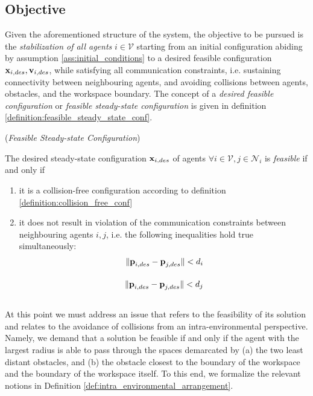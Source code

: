\subsection{Objective}

Given the aforementioned structure of the system, the objective to be
pursued is the \textit{stabilization of all agents} $i \in \mathcal{V}$ starting
from an initial configuration abiding by assumption
\eqref{ass:initial_conditions} to a desired feasible configuration
$\bm{\mathbf{x}}_{i,des}, \bm{\mathbf{v}}_{i,des}$, while
satisfying all communication constraints, i.e. sustaining connectivity between
neighbouring agents, and avoiding collisions between agents, obstacles, and the
workspace boundary. The concept of a \textit{desired feasible configuration}
or \textit{feasible steady-state configuration} is given in definition
\eqref{definition:feasible_steady_state_conf}.

\begin{bw_box}
\begin{definition} (\textit{Feasible Steady-state Configuration})
\label{definition:feasible_steady_state_conf}

The desired steady-state configuration $\bm{\mathbf{x}}_{i,des}$ of agents
$\forall i \in \mathcal{V}, j \in \mathcal{N}_i$ is \textit{feasible} if and
only if
\begin{enumerate}
  \item it is a collision-free configuration according to definition
    \eqref{definition:collision_free_conf}
  \item it does not result in violation of the communication constraints
    between neighbouring agents $i,j$, i.e. the following inequalities hold
    true simultaneously:
    \begin{align}
      \|\bm{\mathbf{p}}_{i,des} - \bm{\mathbf{p}}_{j,des}\| < d_i \\[2.5ex]
      \|\bm{\mathbf{p}}_{i,des} - \bm{\mathbf{p}}_{j,des}\| < d_j \\[2.5ex]
    \end{align}
\end{enumerate}

\end{definition}
\end{bw_box}

At this point we must address an issue
that refers to the feasibility of its solution and relates to the avoidance of
collisions from an intra-environmental perspective. Namely, we demand that a
solution be feasible if and only if the agent with the largest radius is able to
pass through the spaces demarcated by (a) the two least distant obstacles,
and (b) the obstacle closest to the boundary of the workspace and the
boundary of the workspace itself. To this end, we formalize the relevant notions
in Definition \eqref{def:intra_environmental_arrangement}. \\[2.5ex]


